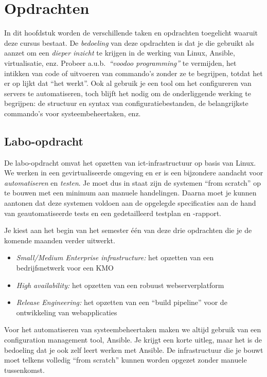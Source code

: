 \chapter{Opdrachten}
\label{ch:opdrachten}

In dit hoofdstuk worden de verschillende taken en opdrachten toegelicht waaruit deze cursus bestaat. De \emph{bedoeling} van deze opdrachten is dat je die gebruikt als aanzet om een \emph{dieper inzicht} te krijgen in de werking van Linux, Ansible, virtualisatie, enz. Probeer a.u.b.~\emph{``voodoo programming''} te vermijden, het intikken van code of uitvoeren van commando's zonder ze te begrijpen, totdat het er op lijkt dat ``het werkt''. Ook al gebruik je een tool om het configureren van servers te automatiseren, toch blijft het nodig om de onderliggende werking te begrijpen: de structuur en syntax van configuratiebestanden, de belangrijkste commando's voor systeembeheertaken, enz.

\section{Labo-opdracht}
\label{sec:labo-opdracht}

De labo-opdracht omvat het opzetten van ict-infrastructuur op basis van Linux. We werken in een gevirtualiseerde omgeving en er is een bijzondere aandacht voor \emph{automatiseren} en \emph{testen}. Je moet dus in staat zijn de systemen ``from scratch'' op te bouwen met een minimum aan manuele handelingen. Daarna moet je kunnen aantonen dat deze systemen voldoen aan de opgelegde specificaties aan de hand van geautomatiseerde tests en een gedetailleerd testplan en -rapport.

Je kiest aan het begin van het semester één van deze drie opdrachten die je de komende maanden verder uitwerkt.

\begin{itemize}
\item \emph{Small/Medium Enterprise infrastructure:} het opzetten van een bedrijfsnetwerk voor een KMO
\item \emph{High availability:} het opzetten van een robuust webserverplatform
\item \emph{Release Engineering:} het opzetten van een ``build pipeline'' voor de ontwikkeling van webapplicaties
\end{itemize}

Voor het automatiseren van systeembeheertaken maken we altijd gebruik van een configuration management tool, Ansible. Je krijgt een korte uitleg, maar het is de bedoeling dat je ook zelf leert werken met Ansible. De infrastructuur die je bouwt moet telkens volledig ``from scratch'' kunnen worden opgezet zonder manuele tussenkomst.

